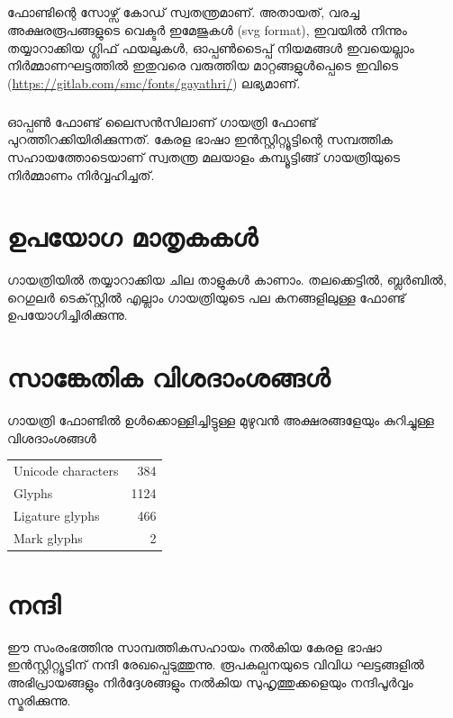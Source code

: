 \documentclass[12pt]{report}
\begin{document}
	\paragraph{}
	ഫോണ്ടിന്റെ സോഴ്സ് കോഡ് സ്വതന്ത്രമാണ്. അതായത്, വരച്ച അക്ഷരരൂപങ്ങളുടെ വെക്ടര്‍ ഇമേജുകള്‍ (svg format), ഇവയില്‍ നിന്നും തയ്യാറാക്കിയ ഗ്ലിഫ് ഫയലുകള്‍, ഓപ്പണ്‍ടൈപ്പ്  നിയമങ്ങള്‍ ഇവയെല്ലാം നിര്‍മ്മാണഘട്ടത്തില്‍ ഇതുവരെ വരുത്തിയ മാറ്റങ്ങളുള്‍പ്പെടെ ഇവിടെ (\url{https://gitlab.com/smc/fonts/gayathri/}) ലഭ്യമാണ്.
	
	\paragraph{}
		ഓപ്പണ്‍ ഫോണ്ട് ലൈസന്‍സിലാണ് ഗായത്രി ഫോണ്ട് പുറത്തിറക്കിയിരിക്കുന്നത്.  കേരള ഭാഷാ ഇൻസ്റ്റിറ്റ്യൂട്ടിന്റെ സമ്പത്തിക സഹായത്തോടെയാണ്  സ്വതന്ത്ര മലയാളം കമ്പ്യൂട്ടിങ്ങ് ഗായത്രിയുടെ നിർമ്മാണം നിർവ്വഹിച്ചത്.
	
	\newpage
	\clearpage
	
	\chapter*{ഉപയോഗ മാതൃകകള്‍‍}
	
	ഗായത്രിയിൽ തയ്യാറാക്കിയ ചില താളുകൾ കാണാം. തലക്കെട്ടിൽ, ബ്ലർബിൽ, റെഗുലർ ടെക്‌സ്റ്റിൽ എല്ലാം ഗായത്രിയുടെ പല കനങ്ങളിലുള്ള  ഫോണ്ട് ഉപയോഗിച്ചിരിക്കുന്നു.

	
	
	
	\chapter*{സാങ്കേതിക വിശദാംശങ്ങള്‍}
	
	ഗായത്രി ഫോണ്ടില്‍ ഉള്‍ക്കൊള്ളിച്ചിട്ടുള്ള മുഴുവന്‍ അക്ഷരങ്ങളേയും കുറിച്ചുള്ള വിശദാംശങ്ങൾ 
	\\[1cm]

    \begin{tabular}[l]{|l|r|}
    \hline
  Unicode characters & 384 \\
Glyphs & 1124 \\
Ligature glyphs & 466 \\
Mark glyphs & 2 \\\hline
\end{tabular}

	
	
	\chapter*{നന്ദി}
	ഈ സംരംഭത്തിനു സാമ്പത്തികസഹായം നൽകിയ കേരള ഭാഷാ ഇൻസ്റ്റിറ്റ്യൂട്ടിന് നന്ദി രേഖപ്പെടുത്തുന്നു.
	രൂപകല്പനയുടെ വിവിധ ഘട്ടങ്ങളിൽ അഭിപ്രായങ്ങളും നിർദ്ദേശങ്ങളും നൽകിയ സുഹൃത്തുക്കളെയും നന്ദിപൂർവ്വം സ്മരിക്കുന്നു.
\end{document}
